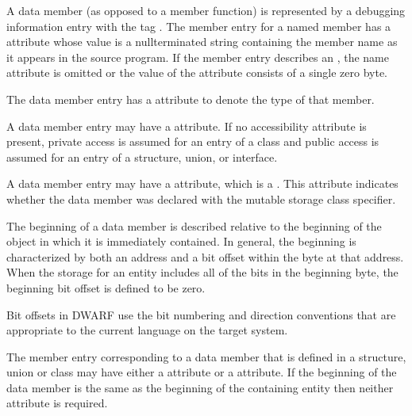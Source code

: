 A data member (as opposed to a member function) is
represented by a debugging information entry with the 
tag \DWTAGmemberTARG. 
The 
member entry for a named member has
a \DWATname{} attribute 
whose value is a null\dash terminated
string containing the member name as it appears in the source
program. If the member entry describes an 
,
the name attribute is omitted or the value of the attribute
consists of a single zero byte.

The data member entry has 
a 
\DWATtype{} attribute to denote
the type of that member.

A data member entry may 
have a 
\DWATaccessibility{}
attribute. If no accessibility attribute is present, private
access is assumed for an entry of a class and public access
is assumed for an entry of a structure, union, or interface.

A data member 
\hypertarget{chap:DWATmutablemutablepropertyofmemberdata}{}
entry 
may 
have a \DWATmutable{} attribute,
which is a . 
This attribute indicates whether the data
member was declared with the mutable storage class specifier.

The beginning of a data member 
is described relative to
the beginning of the object in which it is immediately
contained. In general, the beginning is characterized by
both an address and a bit offset within the byte at that
address. When the storage for an entity includes all of
the bits in the beginning byte, the beginning bit offset is
defined to be zero.

Bit offsets in DWARF use the bit numbering and direction
conventions that are appropriate to the current language on
the target system.

The member entry 
corresponding to a data member that is
\hypertarget{chap:DWATdatabitoffsetdatamemberbitlocation}{}
defined 
\hypertarget{chap:DWATdatamemberlocationdatamemberlocation}{}
in a structure, union or class may have either
a
\DWATdatamemberlocation{} attribute or a
\DWATdatabitoffset{}
attribute. If the beginning of the data member is the same as
the beginning of the containing entity then neither attribute
is required.

